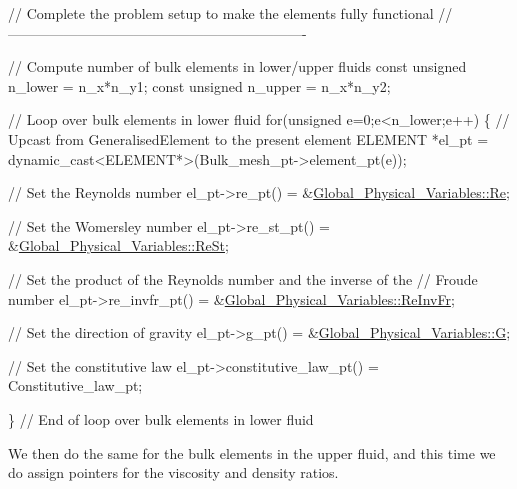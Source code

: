 \begin{DoxyCodeInclude}
 \textcolor{comment}{// Complete the problem setup to make the elements fully functional}
 \textcolor{comment}{// ----------------------------------------------------------------}
 
 \textcolor{comment}{// Compute number of bulk elements in lower/upper fluids}
 \textcolor{keyword}{const} \textcolor{keywordtype}{unsigned} n\_lower = n\_x*n\_y1;
 \textcolor{keyword}{const} \textcolor{keywordtype}{unsigned} n\_upper = n\_x*n\_y2;

 \textcolor{comment}{// Loop over bulk elements in lower fluid}
 \textcolor{keywordflow}{for}(\textcolor{keywordtype}{unsigned} e=0;e<n\_lower;e++)
  \{
   \textcolor{comment}{// Upcast from GeneralisedElement to the present element}
   ELEMENT *el\_pt = \textcolor{keyword}{dynamic\_cast<}ELEMENT*\textcolor{keyword}{>}(Bulk\_mesh\_pt->element\_pt(e));

   \textcolor{comment}{// Set the Reynolds number}
   el\_pt->re\_pt() = &\hyperlink{namespaceGlobal__Physical__Variables_ab814e627d2eb5bc50318879d19ab16b9}{Global\_Physical\_Variables::Re};

   \textcolor{comment}{// Set the Womersley number}
   el\_pt->re\_st\_pt() = &\hyperlink{namespaceGlobal__Physical__Variables_a085ee4bf968ffdd01a41b8c41864f907}{Global\_Physical\_Variables::ReSt};

   \textcolor{comment}{// Set the product of the Reynolds number and the inverse of the}
   \textcolor{comment}{// Froude number}
   el\_pt->re\_invfr\_pt() = &\hyperlink{namespaceGlobal__Physical__Variables_aa6286f02b476912dd7550eced538331a}{Global\_Physical\_Variables::ReInvFr};

   \textcolor{comment}{// Set the direction of gravity}
   el\_pt->g\_pt() = &\hyperlink{namespaceGlobal__Physical__Variables_a37a6f46efcb35b4bd12c73f19d741020}{Global\_Physical\_Variables::G};

   \textcolor{comment}{// Set the constitutive law}
   el\_pt->constitutive\_law\_pt() = Constitutive\_law\_pt;

  \} \textcolor{comment}{// End of loop over bulk elements in lower fluid}

\end{DoxyCodeInclude}


We then do the same for the bulk elements in the upper fluid, and this time we do assign pointers for the viscosity and density ratios.


